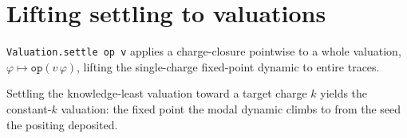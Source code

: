 \section{Lifting settling to valuations}
\begin{proposition}\label{thm:valuation-settle}\leanok{}
\texttt{Valuation.settle op v} applies a charge-closure pointwise to a whole
valuation, $\varphi \mapsto \texttt{op}(v\,\varphi)$, lifting the single-charge
fixed-point dynamic to entire traces.
\end{proposition}
\begin{theorem}\label{thm:settle-knowledgeleast}\leanok{}
Settling the knowledge-least valuation toward a target charge $k$ yields the
constant-$k$ valuation: the fixed point the modal dynamic climbs to from the
seed the positing deposited.
\end{theorem}

